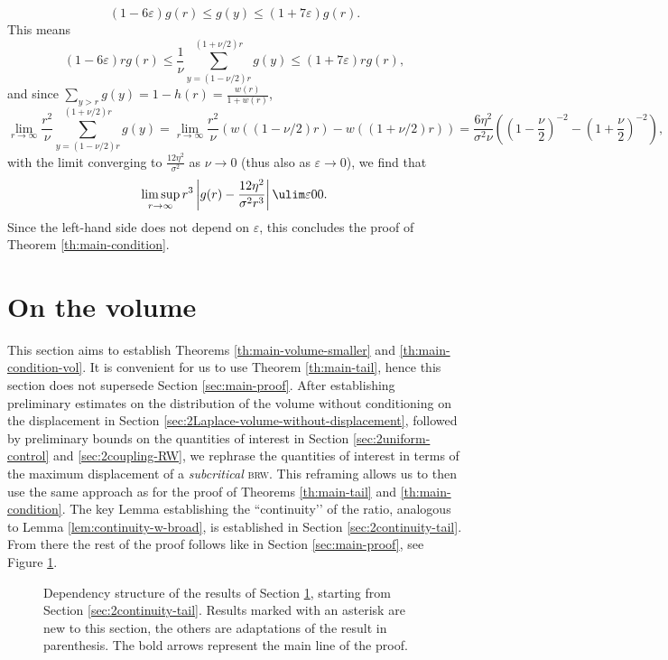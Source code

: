 \documentclass[10pt,a4paper]{article}
\newcommand{\brw}{\textsc{brw}\xspace}
\begin{document}
\[ (1-6\varepsilon) g(r) \leq g(y) \leq (1+7\varepsilon) g(r) . \]
This means
\[ (1-6\varepsilon) r g(r) \leq \frac{1}{\nu} \sum_{y=(1-\nu/2)r}^{(1+\nu/2) r} g(y) \leq (1+7\varepsilon) r g(r) , \]
and since $\sum_{y>r} g(y) = 1-h(r) = \frac{w(r)}{1+w(r)}$, 
\[ \lim_{r\to\infty} \frac{r^2}{\nu} \sum_{y=(1-\nu/2)r}^{(1+\nu/2) r} g(y) = \lim_{r\to\infty} \frac{r^2}{\nu} (w((1-\nu/2)r) - w((1+\nu/2)r)) = \frac{6 \eta^2}{\sigma^2 \nu}\left( \left(1-\frac{\nu}{2}\right)^{-2} - \left(1+\frac{\nu}{2}\right)^{-2} \right) , \]
with the limit converging to $\frac{12 \eta^2}{\sigma^2}$ as $\nu\to 0$ (thus also as $\varepsilon\to 0$), 
we find that 
\[ \limsup_{r\to\infty} r^3 \left| g(r) - \frac{12 \eta^2}{\sigma^2 r^3} \right| \ulim \varepsilon 0 0 . \]
Since the left-hand side does not depend on $\varepsilon$, this concludes the proof of Theorem \ref{th:main-condition}. 













\section{On the volume}
\label{sec:2Volume-general}

This section aims to establish Theorems \ref{th:main-volume-smaller} and \ref{th:main-condition-vol}. It is convenient for us to use Theorem \ref{th:main-tail}, hence this section does not supersede Section \ref{sec:main-proof}. After establishing preliminary estimates on the distribution of the volume without conditioning on the displacement in Section \ref{sec:2Laplace-volume-without-displacement}, followed by preliminary bounds on the quantities of interest in Section \ref{sec:2uniform-control} and \ref{sec:2coupling-RW}, we rephrase the quantities of interest in terms of the maximum displacement of a \emph{subcritical} \brw. This reframing allows us to then use the same approach as for the proof of Theorems \ref{th:main-tail} and \ref{th:main-condition}. The key Lemma establishing the ``continuity’’ of the ratio, analogous to Lemma \ref{lem:continuity-w-broad}, is established in Section \ref{sec:2continuity-tail}. From there the rest of the proof follows like in Section \ref{sec:main-proof}, see Figure \ref{fig:structure-sec-volume}. 




\begin{figure}
\begin{figure}[omitted: a diagram of this paper's results, not reproduced here]\end{figure}
\caption{Dependency structure of the results of Section \ref{sec:2Volume-general}, starting from Section \ref{sec:2continuity-tail}. Results marked with an asterisk are new to this section, the others are adaptations of the result in parenthesis. The bold arrows represent the main line of the proof.}
\label{fig:structure-sec-volume}
\end{figure}
\end{document}
